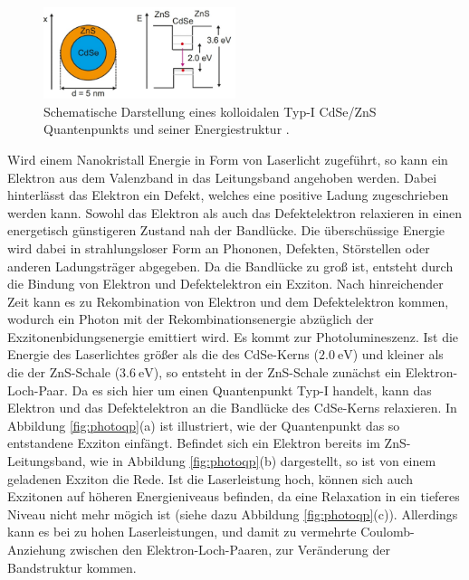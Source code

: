 \begin{figure}[hbtp]
	\centering
	\includegraphics[width=0.5\textwidth]{Abb/ZnS_CdSe.png}
	\caption{Schematische Darstellung eines kolloidalen Typ-I CdSe/ZnS Quantenpunkts
   und seiner Energiestruktur \cite{anleitung}.}
	\label{fig:ZnS_CdSe}
\end{figure}
\noindent
Wird einem Nanokristall Energie in Form von Laserlicht zugeführt, so kann ein
Elektron aus dem Valenzband in das Leitungsband angehoben werden. Dabei hinterlässt
das Elektron ein Defekt, welches eine positive Ladung zugeschrieben werden kann.
Sowohl das Elektron als auch das Defektelektron relaxieren in einen energetisch
günstigeren Zustand nah der Bandlücke. Die überschüssige Energie wird dabei in
strahlungsloser Form an Phononen, Defekten, Störstellen oder anderen Ladungsträger
abgegeben. Da die Bandlücke zu groß ist, entsteht durch die Bindung von Elektron
und Defektelektron ein Exziton. Nach hinreichender Zeit kann es zu Rekombination
von Elektron und dem Defektelektron kommen, wodurch ein Photon mit der
Rekombinationsenergie abzüglich der Exzitonenbidungsenergie emittiert wird.
Es kommt zur Photolumineszenz. Ist die Energie des Laserlichtes größer als die
des CdSe-Kerns ($\SI{2,0}{\electronvolt}$) und kleiner als die der ZnS-Schale
($\SI{3,6}{\electronvolt}$), so entsteht in der ZnS-Schale zunächst ein
Elektron-Loch-Paar. Da es sich hier um einen Quantenpunkt Typ-I handelt, kann das
Elektron und das Defektelektron an die Bandlücke des CdSe-Kerns relaxieren.
In Abbildung \ref{fig:photoqp}(a) ist illustriert, wie der Quantenpunkt das
so entstandene Exziton einfängt. Befindet sich ein Elektron bereits im ZnS-Leitungsband,
wie in Abbildung \ref{fig:photoqp}(b) dargestellt, so ist von einem geladenen
Exziton die Rede. Ist die Laserleistung hoch, können sich auch Exzitonen auf höheren
Energieniveaus befinden, da eine Relaxation in ein tieferes Niveau nicht mehr
mögich ist (siehe dazu Abbildung \ref{fig:photoqp}(c)). Allerdings kann es bei
zu hohen Laserleistungen, und damit zu vermehrte Coulomb-Anziehung zwischen
den Elektron-Loch-Paaren, zur Veränderung der Bandstruktur kommen.

